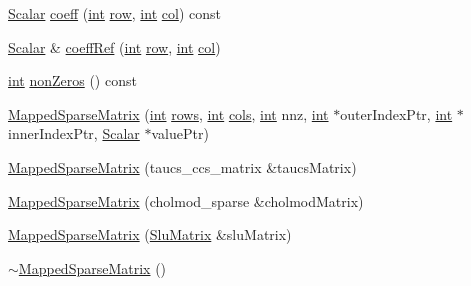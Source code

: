 \begin{DoxyCompactItemize}
\item 
\hyperlink{class_sparse_matrix_base_af39d70f2b7e775e9e17b666cd24128c8}{Scalar} \hyperlink{class_mapped_sparse_matrix_a7cdfc704f7bc199828e42d471c2a62f9}{coeff} (\hyperlink{ioapi_8h_a787fa3cf048117ba7123753c1e74fcd6}{int} \hyperlink{glext_8h_a11b277b422822f784ee248b43eee3e1e}{row}, \hyperlink{ioapi_8h_a787fa3cf048117ba7123753c1e74fcd6}{int} \hyperlink{class_sparse_matrix_base_a711a8f11f5f1915057922412dac2cc25}{col}) const 
\item 
\hyperlink{class_sparse_matrix_base_af39d70f2b7e775e9e17b666cd24128c8}{Scalar} \& \hyperlink{class_mapped_sparse_matrix_a5f5b93fbe6f2fd6bd72721ce0795d165}{coeff\-Ref} (\hyperlink{ioapi_8h_a787fa3cf048117ba7123753c1e74fcd6}{int} \hyperlink{glext_8h_a11b277b422822f784ee248b43eee3e1e}{row}, \hyperlink{ioapi_8h_a787fa3cf048117ba7123753c1e74fcd6}{int} \hyperlink{class_sparse_matrix_base_a711a8f11f5f1915057922412dac2cc25}{col})
\item 
\hyperlink{ioapi_8h_a787fa3cf048117ba7123753c1e74fcd6}{int} \hyperlink{class_mapped_sparse_matrix_a3e69f900026d9111e3a2d5f53e00a4ec}{non\-Zeros} () const 
\item 
\hyperlink{class_mapped_sparse_matrix_a78867a81a45181f2f309a80c3e38dff8}{Mapped\-Sparse\-Matrix} (\hyperlink{ioapi_8h_a787fa3cf048117ba7123753c1e74fcd6}{int} \hyperlink{class_mapped_sparse_matrix_a621f699cf53539cffdeb6e1147057cae}{rows}, \hyperlink{ioapi_8h_a787fa3cf048117ba7123753c1e74fcd6}{int} \hyperlink{class_mapped_sparse_matrix_a95c09c9411049f7f2a6ded6b873b4ea3}{cols}, \hyperlink{ioapi_8h_a787fa3cf048117ba7123753c1e74fcd6}{int} nnz, \hyperlink{ioapi_8h_a787fa3cf048117ba7123753c1e74fcd6}{int} $\ast$outer\-Index\-Ptr, \hyperlink{ioapi_8h_a787fa3cf048117ba7123753c1e74fcd6}{int} $\ast$inner\-Index\-Ptr, \hyperlink{class_sparse_matrix_base_af39d70f2b7e775e9e17b666cd24128c8}{Scalar} $\ast$value\-Ptr)
\item 
\hyperlink{class_mapped_sparse_matrix_a00e5a77564b8c0805ded7b048b715b96}{Mapped\-Sparse\-Matrix} (taucs\-\_\-ccs\-\_\-matrix \&taucs\-Matrix)
\item 
\hyperlink{class_mapped_sparse_matrix_ab17b56fe9515168a2b6ae1e8af781fc0}{Mapped\-Sparse\-Matrix} (cholmod\-\_\-sparse \&cholmod\-Matrix)
\item 
\hyperlink{class_mapped_sparse_matrix_a11274367b6030922b24e6eefff498999}{Mapped\-Sparse\-Matrix} (\hyperlink{struct_slu_matrix}{Slu\-Matrix} \&slu\-Matrix)
\item 
\hyperlink{class_mapped_sparse_matrix_a09e236ea9967d4f83359fab89eff3dc5}{$\sim$\-Mapped\-Sparse\-Matrix} ()
\end{DoxyCompactItemize}
